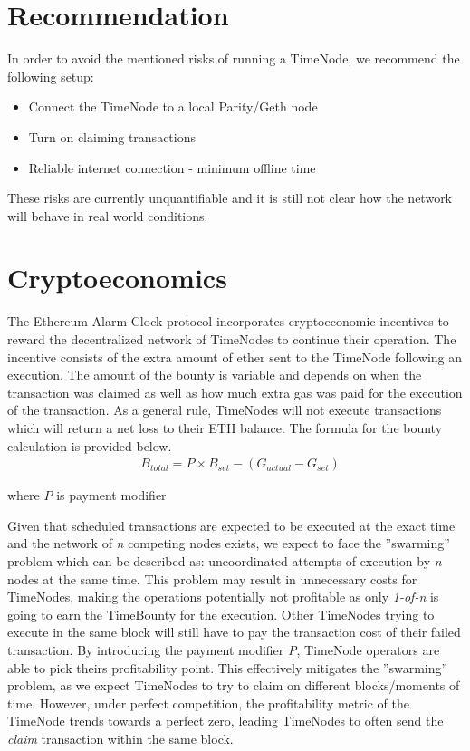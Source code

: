 \documentclass{report}
\begin{document}
  \section{Recommendation}
  In order to avoid the mentioned risks of running a TimeNode, we recommend the following setup:
  \begin{itemize}
    \item Connect the TimeNode to a local Parity/Geth node
    \item Turn on claiming transactions
    \item Reliable internet connection - minimum offline time
  \end{itemize}

  These risks are currently unquantifiable and it is still not clear how the network will behave in real world conditions.

  \section{Cryptoeconomics}
  The Ethereum Alarm Clock protocol incorporates cryptoeconomic incentives to reward the decentralized network of TimeNodes to continue their operation. The incentive consists of the extra amount of ether sent to the TimeNode following an execution. The amount of the bounty is variable and depends on when the transaction was claimed as well as how much extra gas was paid for the execution of the transaction. As a general rule, TimeNodes will not execute transactions which will return a net loss to their ETH balance. The formula for the bounty calculation is provided below.
  \begin{align*}
    &B_{total} = P \times B_{set} - (G_{actual} - G_{set})
  \end{align*}

  where $P$ is payment modifier

  Given that scheduled transactions are expected to be executed at the exact time and the network of \textit{n} competing nodes exists, we expect to face the ”swarming” problem which can be described as: uncoordinated attempts of execution by \textit{n} nodes at the same time. This problem may result in unnecessary costs for TimeNodes, making the operations potentially not profitable as only \textit{1-of-n} is going to earn the TimeBounty for the execution. Other TimeNodes trying to execute in the same block will still have to pay the transaction cost of their failed transaction. By introducing the payment modifier \textit{P}, TimeNode operators are able to pick theirs profitability point. This effectively mitigates the ”swarming” problem, as we expect TimeNodes to try to claim on different blocks/moments of time. However, under perfect competition, the profitability metric of the TimeNode trends towards a perfect zero, leading TimeNodes to often send the \textit{claim} transaction within the same block.
\end{document}
